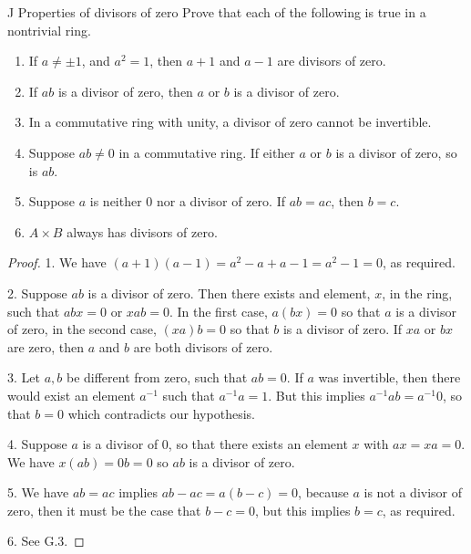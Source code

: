 \begin{exercise}{J Properties of divisors of zero}
Prove that each of the following is true in a nontrivial ring.
\begin{enumerate}
    \item If $a\neq \pm1$, and $a^{2}=1$, then $a+1$ and $a-1$ are divisors of zero.
    \item If $ab$ is a divisor of zero, then $a$ or $b$ is a divisor of zero.
    \item In a commutative ring with unity, a divisor of zero cannot be invertible.
    \item Suppose $ab\neq 0$ in a commutative ring. If either $a$ or $b$ is a divisor of zero, so is $ab$.
    \item Suppose $a$ is neither 0 nor a divisor of zero. If $ab=ac$, then $b=c$.
    \item $A\times B$ always has divisors of zero.
\end{enumerate}
\end{exercise}
\begin{proof}
 1. We have $(a+1)(a-1)=a^{2}-a+a-1=a^{2}-1=0$, as required.
 
 2. Suppose $ab$ is a divisor of zero. Then there exists and element, $x$, in the ring, such that $abx=0$ or $xab=0$. In the first case, $a(bx)=0$ so that $a$ is a divisor of zero, in the second case, $(xa)b=0$ so that $b$ is a divisor of zero. If $xa$ or $bx$ are zero, then $a$ and $b$ are both divisors of zero.
 
 3. Let $a,b$ be different from zero, such that $ab=0$. If $a$ was invertible, then there would exist an element $a^{-1}$ such that $a^{-1}a=1$. But this implies $a^{-1}ab=a^{-1}0$, so that $b=0$ which contradicts our hypothesis.
 
 4. Suppose $a$ is a divisor of 0, so that there exists an element $x$ with $ax=xa=0$. We have $x(ab)=0b=0$ so $ab$ is a divisor of zero.
 
 5. We have $ab=ac$ implies $ab-ac=a(b-c)=0$, because $a$ is not a divisor of zero, then it must be the case that $b-c=0$, but this implies $b=c$, as required.

 6. See G.3.
\end{proof}


